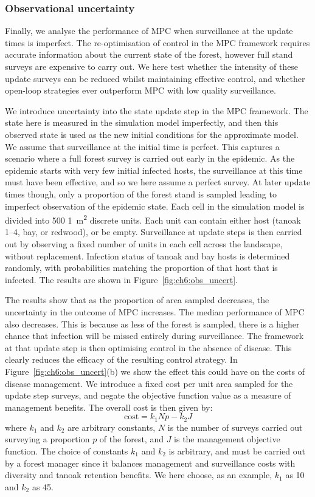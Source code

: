 \subsubsection{Observational uncertainty}

Finally, we analyse the performance of MPC when surveillance at the update times is imperfect. The re-optimisation of control in the MPC framework requires accurate information about the current state of the forest, however full stand surveys are expensive to carry out. We here test whether the intensity of these update surveys can be reduced whilst maintaining effective control, and whether open-loop strategies ever outperform MPC with low quality surveillance.

We introduce uncertainty into the state update step in the MPC framework. The state here is measured in the simulation model imperfectly, and then this observed state is used as the new initial conditions for the approximate model. We assume that surveillance at the initial time is perfect. This captures a scenario where a full forest survey is carried out early in the epidemic. As the epidemic starts with very few initial infected hosts, the surveillance at this time must have been effective, and so we here assume a perfect survey. At later update times though, only a proportion of the forest stand is sampled leading to imperfect observation of the epidemic state. Each cell in the simulation model is divided into 500 \SI{1}{\meter\squared} discrete units. Each unit can contain either host (tanoak 1--4, bay, or redwood), or be empty. Surveillance at update steps is then carried out by observing a fixed number of units in each cell across the landscape, without replacement. Infection status of tanoak and bay hosts is determined randomly, with probabilities matching the proportion of that host that is infected. The results are shown in Figure~\ref{fig:ch6:obs_uncert}.

The results show that as the proportion of area sampled decreases, the uncertainty in the outcome of MPC increases. The median performance of MPC also decreases. This is because as less of the forest is sampled, there is a higher chance that infection will be missed entirely during surveillance. The framework at that update step is then optimising control in the absence of disease. This clearly reduces the efficacy of the resulting control strategy. In Figure~\ref{fig:ch6:obs_uncert}(b) we show the effect this could have on the costs of disease management. We introduce a fixed cost per unit area sampled for the update step surveys, and negate the objective function value as a measure of management benefits. The overall cost is then given by:
\begin{equation}
    \textrm{cost} = k_1Np - k_2J
\end{equation}
where $k_1$ and $k_2$ are arbitrary constants, $N$ is the number of surveys carried out surveying a proportion $p$ of the forest, and $J$ is the management objective function. The choice of constants $k_1$ and $k_2$ is arbitrary, and must be carried out by a forest manager since it balances management and surveillance costs with diversity and tanoak retention benefits. We here choose, as an example, $k_1$ as 10 and $k_2$ as 45.

